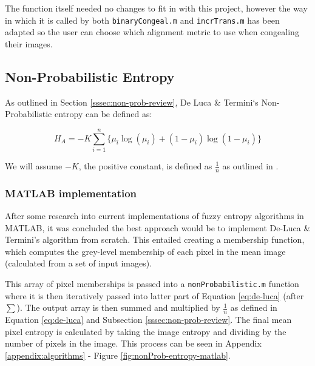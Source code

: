 The function itself needed no changes to fit in with this project, however the way in which it is called by both \texttt{binaryCongeal.m} and \texttt{incrTrans.m} has been adapted so the user can choose which alignment metric to use when congealing their images.

\newpage
\subsection{Non-Probabilistic Entropy}
\label{ssec:non-prob-sec}

As outlined in Section \ref{sssec:non-prob-review}, De Luca \& Termini`s Non-Probabilistic entropy can be defined as:

\begin{equation}
  \label{eq:de-luca}
  H_A = -K \displaystyle\sum_{i=1}^{n}{\{\mu_i\log(\mu_i) + (1 - \mu_i)\log(1 - \mu_i)\}}
\end{equation}


We will assume $-K$, the positive constant, is defined as $\frac{1}{n}$ as outlined in \cite{DeLuca_Termini_1972}.

\subsubsection{MATLAB implementation}

After some research into current implementations of fuzzy entropy algorithms in MATLAB, it was concluded the best approach would be to implement De-Luca \& Termini's algorithm from scratch. This entailed creating a membership function, which computes the grey-level membership of each pixel in the mean image (calculated from a set of input images).

This array of pixel memberships is passed into a \texttt{nonProbabilistic.m} function where it is then iteratively passed into latter part of Equation \ref{eq:de-luca} \big(after $\displaystyle\sum$\big). The output array is then summed and multiplied by $\frac{1}{n}$ as defined in Equation \ref{eq:de-luca} and Subsection \ref{sssec:non-prob-review}. The final mean pixel entropy is calculated by taking the image entropy and dividing by the number of pixels in the image. This process can be seen in Appendix \ref{appendix:algorithms} - Figure \ref{fig:nonProb-entropy-matlab}.

